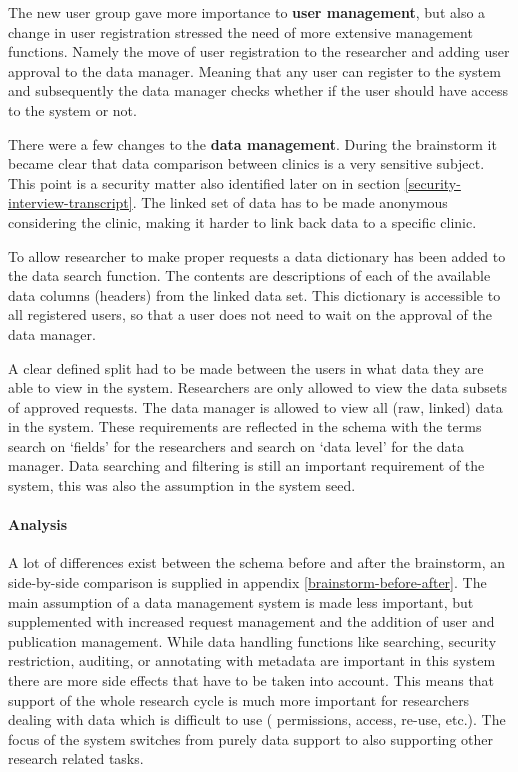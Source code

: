 The new user group gave more importance to \textbf{user management}, but also a change in user registration stressed the need of more extensive management functions.
Namely the move of user registration to the researcher and adding user approval to the data manager.
Meaning that any user can register to the system and subsequently the data manager checks whether if the user should have access to the system or not.

There were a few changes to the \textbf{data management}.
During the brainstorm it became clear that data comparison between clinics is a very sensitive subject.
This point is a security matter also identified later on in section \ref{security-interview-transcript}.
The linked set of data has to be made anonymous considering the clinic, making it harder to link back data to a specific clinic.

To allow researcher to make proper requests a data dictionary has been added to the data search function.
The contents are descriptions of each of the available data columns (headers) from the linked data set.
This dictionary is accessible to all registered users, so that a user does not need to wait on the approval of the data manager.

A clear defined split had to be made between the users in what data they are able to view in the system.
Researchers are only allowed to view the data subsets of approved requests.
The data manager is allowed to view all (raw, linked) data in the system.
These requirements are reflected in the schema with the terms search on `fields' for the researchers and search on `data level' for the data manager.
Data searching and filtering is still an important requirement of the system, this was also the assumption in the system seed.

\paragraph{Analysis}
A lot of differences exist between the schema before and after the brainstorm, an side-by-side comparison is supplied in appendix \ref{brainstorm-before-after}.
The main assumption of a data management system is made less important, but supplemented with increased request management and the addition of user and publication management.
While data handling functions like searching, security restriction, auditing, or annotating with metadata are important in this system there are more side effects that have to be taken into account.
This means that support of the whole research cycle is much more important for researchers dealing with data which is difficult to use (\ie{} permissions, access, re-use, etc.).
The focus of the system switches from purely data support to also supporting other research related tasks.

